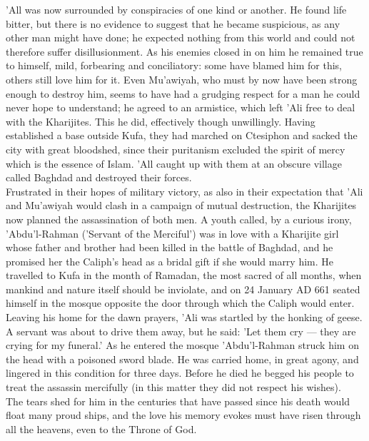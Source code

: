 \documentclass[10pt, twoside]{book}
\begin{document}
'All was now surrounded by conspiracies of one kind or another. He found life bitter, but there is no evidence to suggest that he became suspicious, as any other man might have done; he expected nothing from this world and could not therefore suffer disillusionment. As his enemies closed in on him he remained true to himself, mild, forbearing and conciliatory: some have blamed him for this, others still love him for it. Even Mu'awiyah, who must by now have been strong enough to destroy him, seems to have had a grudging respect for a man he could never hope to understand; he agreed to an armistice, which left 'Ali free to deal with the Kharijites. This he did, effectively though unwillingly. Having established a base outside Kufa, they had marched on Ctesiphon and sacked the city with great bloodshed, since their puritanism excluded the spirit of mercy which is the essence of Islam. 'All caught up with them at an obscure village called Baghdad and destroyed their forces. \\

Frustrated in their hopes of military victory, as also in their expectation that 'Ali and Mu'awiyah would clash in a campaign of mutual destruction, the Kharijites now planned the assassination of both men. A youth called, by a curious irony, 'Abdu'l\hyp{}Rahman ('Servant of the Merciful') was in love with a Kharijite girl whose father and brother had been killed in the battle of Baghdad, and he promised her the Caliph's head as a bridal gift if she would marry him. He travelled to Kufa in the month of Ramadan, the most sacred of all months, when mankind and nature itself should be inviolate, and on 24 January AD 661 seated himself in the mosque opposite the door through which the Caliph would enter. \\

Leaving his home for the dawn prayers, 'Ali was startled by the honking of geese. A servant was about to drive them away, but he said: 'Let them cry --- they are crying for my funeral.' As he entered the mosque 'Abdu'l\hyp{}Rahman struck him on the head with a poisoned sword blade. He was carried home, in great agony, and lingered in this condition for three days. Before he died he begged his people to treat the assassin mercifully (in this matter they did not respect his wishes). \\

The tears shed for him in the centuries that have passed since his death would float many proud ships, and the love his memory evokes must have risen through all the heavens, even to the Throne of God. \\
\end{document}
